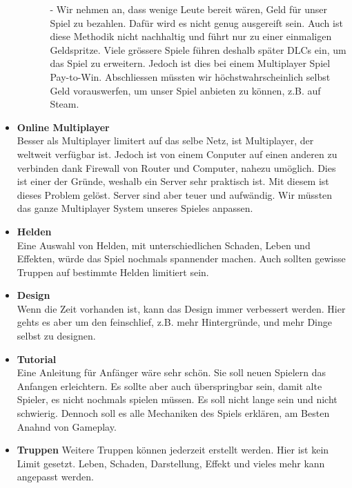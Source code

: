 \begin{itemize}
\begin{enumerate}
\begin{itemize}
            \item[-] Wir nehmen an, dass wenige Leute bereit wären, Geld für unser Spiel zu bezahlen.
                    Dafür wird es nicht genug ausgereift sein.
                    Auch ist diese Methodik nicht nachhaltig und führt nur zu einer einmaligen Geldspritze.
                    Viele grössere Spiele führen deshalb später
                    DLCs ein, um das Spiel zu erweitern.
                    Jedoch ist dies bei einem Multiplayer Spiel Pay-to-Win.
                    Abschliessen müssten wir höchstwahrscheinlich selbst Geld vorauswerfen, um unser Spiel anbieten zu können, z.B. auf Steam.
        \end{itemize}
        
    \end{enumerate}
    \item \textbf{Online Multiplayer} \\
        Besser als Multiplayer limitert auf das selbe Netz, ist Multiplayer, der weltweit verfügbar ist. Jedoch ist von einem Conputer auf einen anderen zu
        verbinden dank Firewall von Router und Computer, nahezu umöglich. Dies ist einer der Gründe, weshalb ein Server sehr praktisch ist. Mit diesem ist dieses
        Problem gelöst. Server sind aber teuer und aufwändig. Wir müssten das ganze Multiplayer System unseres Spieles anpassen.
    \item \textbf{Helden} \\
        Eine Auswahl von Helden, mit unterschiedlichen Schaden, Leben und Effekten, würde das Spiel nochmals spannender machen. Auch sollten gewisse Truppen auf bestimmte Helden limitiert sein. 
    \item \textbf{Design} \\
        Wenn die Zeit vorhanden ist, kann das Design immer verbessert werden. Hier gehts es aber um den feinschlief, z.B. mehr Hintergründe, und mehr Dinge selbst zu designen.
    \item \textbf{Tutorial} \\
        Eine Anleitung für Anfänger wäre sehr schön. Sie soll neuen Spielern das Anfangen erleichtern. Es sollte aber auch überspringbar sein,
        damit alte Spieler, es nicht nochmals spielen müssen. Es soll nicht lange sein und nicht schwierig. Dennoch soll es alle Mechaniken des Spiels
        erklären, am Besten Anahnd von Gameplay.
    \item \textbf{Truppen}
        Weitere Truppen können jederzeit erstellt werden. Hier ist kein Limit gesetzt. Leben, Schaden, Darstellung, Effekt und vieles mehr kann angepasst werden.

\end{itemize}
